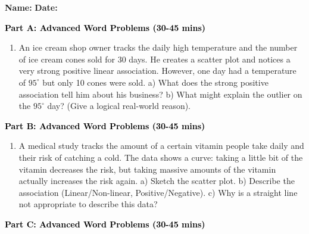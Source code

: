 \documentclass[12pt, letterpaper, fleqn]{article}
\begin{document}
\textbf{Name:} \underline{\hspace{5cm}}
\hfill
\textbf{Date:} \underline{\hspace{3cm}}\\


\begin{tcolorbox}[colback=customteal!20]
\large\textcolor{black}{\textbf{Part A: Advanced Word Problems (30-45 mins)}}
\end{tcolorbox}

\vspace{3mm}

\begin{enumerate}[itemsep=5.5cm, leftmargin=0.6cm]
\item An ice cream shop owner tracks the daily high temperature and the number of ice cream cones sold for 30 days. He creates a scatter plot and notices a very strong positive linear association. However, one day had a temperature of $95^\circ$ but only 10 cones were sold. 
a) What does the strong positive association tell him about his business?
b) What might explain the outlier on the $95^\circ$ day? (Give a logical real-world reason).
\end{enumerate}

\newpage

\begin{tcolorbox}[colback=customteal!20]
\large\textcolor{black}{\textbf{Part B: Advanced Word Problems (30-45 mins)}}
\end{tcolorbox}

\vspace{3mm}

\begin{enumerate}[itemsep=5.5cm, leftmargin=0.6cm, resume]
\item A medical study tracks the amount of a certain vitamin people take daily and their risk of catching a cold. The data shows a curve: taking a little bit of the vitamin decreases the risk, but taking massive amounts of the vitamin actually increases the risk again. 
a) Sketch the scatter plot. 
b) Describe the association (Linear/Non-linear, Positive/Negative). 
c) Why is a straight line not appropriate to describe this data?
\end{enumerate}

\newpage

\begin{tcolorbox}[colback=customteal!20]
\large\textcolor{black}{\textbf{Part C: Advanced Word Problems (30-45 mins)}}
\end{tcolorbox}
\end{document}

